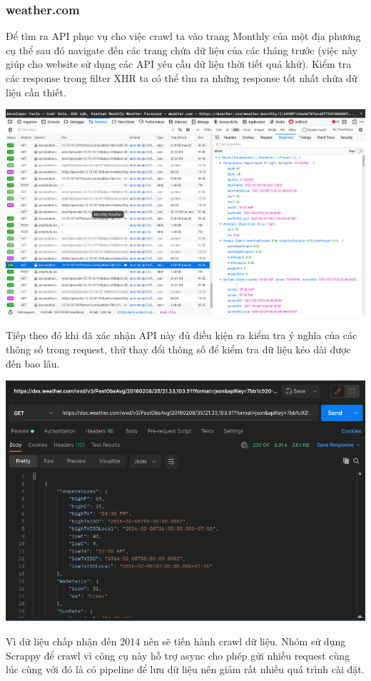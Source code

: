 \documentclass{article}
\begin{document}
\subsubsection{weather.com}
\qquad Để tìm ra API phục vụ cho việc crawl ta vào trang Monthly của một địa phương cụ thể sau đó navigate đến các trang chứa dữ liệu của các tháng trước (việc này giúp cho website sử dụng các API yêu cầu dữ liệu thời tiết quá khứ). Kiểm tra các response trong filter XHR ta có thể tìm ra những response tốt nhất chứa dữ liệu cần thiết.

\includegraphics[width=6in]{images/inspect.png}

Tiếp theo đó khi đã xác nhận API này đủ điều kiện ra kiểm tra ý nghĩa của các thông số trong request, thử thay đổi thông số để kiểm tra dữ liệu kéo dài được đến bao lâu.

\includegraphics[width=6in]{images/checkpast.png}

Vì dữ liệu chấp nhận đến 2014 nên sẽ tiến hành crawl dữ liệu. Nhóm sử dụng Scrappy để crawl vì công cụ này hỗ trợ async cho phép gửi nhiều request cùng lúc cùng với đó là có pipeline để lưu dữ liệu nên giảm rất nhiều quá trình cài đặt.
\end{document}
